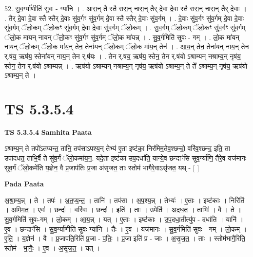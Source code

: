\documentclass[17pt]{extarticle}
\begin{document}
52. सु॒व॒र्ग्या॑णीति॑ सुवः - ग्या॑नि । . आस॒न् तै स्तै रास॒न् नास॒न् तैर् दे॒वा दे॒वा स्तै रास॒न् नास॒न् तैर् दे॒वाः । . तैर् दे॒वा दे॒वा स्तै स्तैर् दे॒वाः सु॑व॒र्गꣳ सु॑व॒र्गम् दे॒वा स्तै स्तैर् दे॒वाः सु॑व॒र्गम् । . दे॒वाः सु॑व॒र्गꣳ सु॑व॒र्गम् दे॒वा दे॒वाः सु॑व॒र्गम् ॅलो॒कम् ॅलो॒कꣳ सु॑व॒र्गम् दे॒वा दे॒वाः सु॑व॒र्गम् ॅलो॒कम् । . सु॒व॒र्गम् ॅलो॒कम् ॅलो॒कꣳ सु॑व॒र्गꣳ सु॑व॒र्गम् ॅलो॒क मा॑यन् नायन् ॅलो॒कꣳ सु॑व॒र्गꣳ सु॑व॒र्गम् ॅलो॒क मा॑यन्न् । . सु॒व॒र्गमिति॑ सुवः - गम् । . लो॒क मा॑यन् नायन् ॅलो॒कम् ॅलो॒क मा॑य॒न् तेन॒ तेना॑यन् ॅलो॒कम् ॅलो॒क मा॑य॒न् तेन॑ । . आ॒य॒न् तेन॒ तेना॑यन् नाय॒न् तेन र्.ष॑य॒ ऋष॑य॒ स्तेना॑यन् नाय॒न् तेन र्.ष॑यः । . तेन र्.ष॑य॒ ऋष॑य॒ स्तेन॒ तेन र्.ष॑यो ऽश्राम्यन् नश्राम्य॒न् नृष॑य॒ स्तेन॒ तेन र्.ष॑यो ऽश्राम्यन्न् । . ऋष॑यो ऽश्राम्यन् नश्राम्य॒न् नृष॑य॒ ऋष॑यो ऽश्राम्य॒न् ते ते᳚ ऽश्राम्य॒न् नृष॑य॒ ऋष॑यो ऽश्राम्य॒न् ते । \newline
\pagebreak
{}

\section{ TS 5.3.5.4 }

\textbf{TS 5.3.5.4 } \newline
\textbf{Samhita Paata} \newline

ऽश्राम्य॒न् ते तपो॑ऽतप्यन्त॒ तानि॒ तप॑साऽपश्य॒न् तेभ्य॑ ए॒ता इष्ट॑का॒ निर॑मिम॒तेव॒श्छन्दो॒ वरि॑व॒श्छन्द॒ इति॒ ता उपा॑दधत॒ ताभि॒र्वै ते सु॑व॒र्गं ॅलो॒कमा॑य॒न॒. यदे॒ता इष्ट॑का उप॒दधा॑ति॒ यान्ये॒व छन्दाꣳ॑सि सुव॒र्ग्या॑णि॒ तैरे॒व यज॑मानः सुव॒र्गं ॅलो॒कमे॑ति य॒ज्ञेन॒ वै प्र॒जाप॑तिः प्र॒जा अ॑सृजत॒ ताः स्तोम॑ भागैरे॒वाऽसृ॑जत॒ यथ् - [  ] \newline

\textbf{Pada Paata} \newline

अ॒श्रा॒म्य॒न्न् । ते । तपः॑ । अ॒त॒प्य॒न्त॒ । तानि॑ । तप॑सा । अ॒प॒श्य॒न्न् । तेभ्यः॑ । ए॒ताः । इष्ट॑काः । निरिति॑ । अ॒मि॒म॒त॒ । एवः॑ । छन्दः॑ । वरि॑वः । छन्दः॑ । इति॑ । ताः । उपेति॑ । अ॒द॒ध॒त॒ । ताभिः॑ । वै । ते । सु॒व॒र्गमिति॑ सुवः-गम् । लो॒कम् । आ॒य॒न्न् । यत् । ए॒ताः । इष्ट॑काः । उ॒प॒दधा॒तीत्यु॑प - दधा॑ति । यानि॑ । ए॒व । छन्दाꣳ॑सि । सु॒व॒र्ग्या॑णीति॑ सुवः-ग्या॑नि । तैः । ए॒व । यज॑मानः । सु॒व॒र्गमिति॑ सुवः - गम् । लो॒कम् । ए॒ति॒ । य॒ज्ञेन॑ । वै । प्र॒जाप॑ति॒रिति॑ प्र॒जा - प॒तिः॒ । प्र॒जा इति॑ प्र - जाः । अ॒सृ॒ज॒त॒ । ताः । स्तोम॑भागै॒रिति॒ स्तोम॑ - भा॒गैः॒ । ए॒व । अ॒सृ॒ज॒त॒ । यत् ।  \newline
\end{document}
